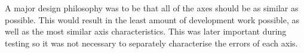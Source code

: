A major design philosophy was to be that all of the axes should be as
similar as possible. This would result in the least amount of development
work possible, as well as the most similar axis characteristics. This 
was later important during testing so it was not necessary to separately
characterise the errors of each axis.

%
%



%




